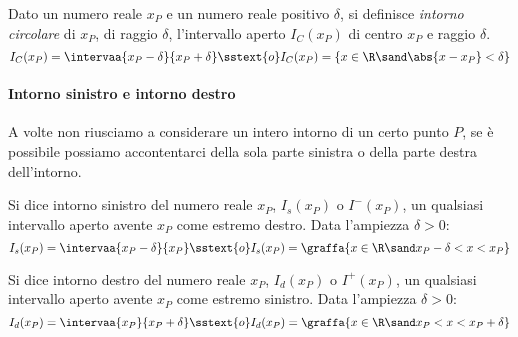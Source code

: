 \begin{newdef}{}{}
Dato un numero reale \(x_P\) e un numero reale positivo \(\delta\), si 
definisce \emph{intorno circolare} di \(x_P\), di raggio \(\delta\), 
l'intervallo aperto \(I_C(x_P)\) di centro \(x_P\) e raggio \(\delta\).
\[I_C(x_P)= \intervaa{x_P-\delta}{x_P+\delta} \sstext{o} 
  I_C(x_P) = \{x \in \R \sand \abs{x-x_P} < \delta\}\]
\end{newdef}

\begin{center} \intornocircolare \end{center}


\paragraph{Intorno sinistro e intorno destro}
A volte non riusciamo a considerare un intero intorno di un certo punto 
\(P\), se è possibile possiamo accontentarci della sola parte sinistra o 
della parte destra dell'intorno.

\begin{newdef}{}{}
Si dice intorno sinistro del numero reale \(x_P\), \(I_s(x_P)\) o 
\(I^-(x_P)\), un qualsiasi intervallo aperto avente \(x_P\) come estremo 
destro. 
Data l'ampiezza \(\delta > 0\):
\[I_s(x_P) = \intervaa{x_P-\delta}{x_P} \sstext{o} 
  I_s(x_P) = \graffa{x \in \R \sand x_P-\delta < x < x_P}\]
\end{newdef}

\begin{center}  \end{center}



\begin{newdef}{}{}
Si dice intorno destro del numero reale \(x_P\), \(I_d(x_P)\) o 
\(I^+(x_P)\), un qualsiasi intervallo aperto avente \(x_P\) come estremo 
sinistro. 
Data l'ampiezza \(\delta > 0\):
\[I_d(x_P) = \intervaa{x_P}{x_P+\delta} \sstext{o} 
  I_d(x_P) = \graffa{x \in \R \sand x_P < x < x_P+\delta}\]
\end{newdef}

